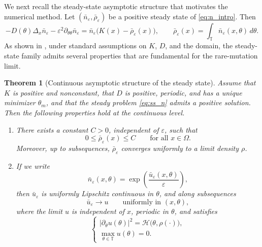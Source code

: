 \documentclass[11pt]{article}
\newtheorem{theorem}{Theorem}[section]
\begin{document}
We next recall the steady-state asymptotic structure that motivates the numerical method. Let \((\bar n_\varepsilon,\bar \rho_\varepsilon)\) be a positive steady state of \eqref{eq:n_intro}. Then
\begin{equation}\label{eq:ss_n}
-D(\theta)\Delta_x \bar n_\varepsilon
-\varepsilon^2\partial_{\theta\theta} \bar n_\varepsilon
=
\bar n_\varepsilon\bigl(K(x)-\bar\rho_\varepsilon(x)\bigr),
\qquad
\bar\rho_\varepsilon(x)=\int_{\mathbb T} \bar n_\varepsilon(x,\theta)\,d\theta.
\end{equation}
As shown in \cite{PerthameSouganidis}, under standard assumptions on \(K\), \(D\), and the domain, the steady-state family admits several properties that are fundamental for the rare-mutation limit.

\begin{theorem}[Continuous asymptotic structure of the steady state]\label{prop:continuous_structure}
Assume that \(K\) is positive and nonconstant, that \(D\) is positive, periodic, and has a unique minimizer \(\theta_m\), and that the steady problem \eqref{eq:ss_n} admits a positive solution. Then the following properties hold at the continuous level.
\begin{enumerate}
\item There exists a constant \(C>0\), independent of \(\varepsilon\), such that
\begin{equation}\label{eq:rho_continuous_bound}
0\le \bar\rho_\varepsilon(x)\le C
\qquad \text{for all } x\in\Omega.
\end{equation}
Moreover, up to subsequences, \(\bar\rho_\varepsilon\) converges uniformly to a limit density \(\rho\).

\item If we write
\begin{equation}\label{eq:u_log_transform}
\bar n_\varepsilon(x,\theta)=\exp\!\left(\frac{\bar u_\varepsilon(x,\theta)}{\varepsilon}\right),
\end{equation}
then \(\bar u_\varepsilon\) is uniformly Lipschitz continuous in \(\theta\), and along subsequences
\begin{equation}\label{eq:u_limit_uniform}
\bar u_\varepsilon \to u
\qquad \text{uniformly in } (x,\theta),
\end{equation}
where the limit \(u\) is independent of \(x\), periodic in \(\theta\), and satisfies
\begin{equation}\label{eq:HJ_limit}
\begin{cases}
|\partial_\theta u(\theta)|^2 = \mathcal H\bigl(\theta,\rho(\cdot)\bigr),\\[1mm]
\displaystyle \max_{\theta\in\mathbb T} u(\theta)=0.
\end{cases}
\end{equation}


\end{enumerate}
\end{theorem}
\end{document}
